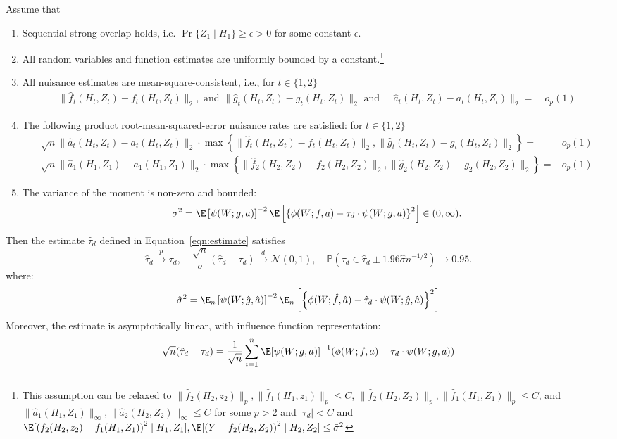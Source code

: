 \begin{theorem}\label{thm:inference}
Assume that
\begin{enumerate}
 \item Sequential strong overlap holds, i.e. $\Pr\{Z_1\mid H_1\}\geq \epsilon > 0$ for some constant $\epsilon$.
    \item All random variables and function estimates are uniformly bounded by a constant.\footnote{This assumption can be relaxed to $\|\hat{f}_2(H_2, z_2)\|_p, \|\hat{f}_1(H_1, z_1)\|_p\leq C$, $\|\hat{f}_2(H_2, Z_2)\|_p, \|\hat{f}_1(H_1, Z_1)\|_p \leq C$, and $\|\hat{a}_1(H_1, Z_1)\|_{\infty}, \|\hat{a}_2(H_2, Z_2)\|_{\infty}\leq C$  for some $p>2$ and $|\tau_d|<C$ and $\E[\left(f_2(H_2, z_2) - f_1(H_1, Z_1)\right)^2\mid H_1, Z_1],\E[\left(Y - f_2(H_2, Z_2)\right)^2\mid H_2, Z_2]\leq \bar{\sigma}^2$}
    \item All nuisance estimates are mean-square-consistent, i.e., for $t\in \{1, 2\}$
    \begin{align*}
        \|\hat{f}_t(H_t, Z_t) - f_t(H_t, Z_t)\|_2, \text{ and } \|\hat{g}_t(H_t, Z_t) - g_t(H_t, Z_t)\|_2 \text{ and } \|\hat{a}_t(H_t, Z_t) - a_t(H_t, Z_t)\|_2=~& o_p(1)
    \end{align*}
    \item The following product root-mean-squared-error nuisance rates are satisfied: for $t\in \{1, 2\}$
    \begin{align*}
    \sqrt{n}\|\hat{a}_t(H_t, Z_t) - a_t(H_t, Z_t)\|_2\cdot \max\left\{\|\hat{f}_t(H_t, Z_t) - f_t(H_t, Z_t)\|_2, \|\hat{g}_t(H_t, Z_t) - g_t(H_t, Z_t)\|_2\right\} =& o_p(1)\\
    \sqrt{n} \|\hat{a}_1(H_1, Z_1) - a_1(H_1, Z_1)\|_2\cdot \max\left\{\|\hat{f}_2(H_2, Z_2) - f_2(H_2, Z_2)\|_2,\|\hat{g}_2(H_2, Z_2) - g_2(H_2, Z_2)\|_2\right\} =& o_p(1)
    \end{align*}
    \item The variance of the moment is non-zero and bounded: 
    $$
    \sigma^2=\E\left[\psi(W; g, a)\right]^{-2} \E\left[\left\{\phi(W;f, a) - \tau_d\cdot   \psi(W; g, a)\right\}^2\right] \in (0, \infty).
    $$
\end{enumerate}
Then the estimate $\hat{\tau}_d$ defined in Equation~\eqref{eqn:estimate} satisfies
$$
\hat{\tau}_d\overset{p}{\rightarrow}\tau_d,\quad \frac{\sqrt{n}}{\sigma}(\hat{\tau}_d-\tau_d)\overset{d}{\rightarrow}\mathcal{N}(0,1),\quad \mathbb{P}(\tau_d\in \hat{\tau}_d \pm 1.96 \hat{\sigma}n^{-1/2})\rightarrow 0.95. 
$$
where:
\begin{align}\label{eqn:approx-variance}
    \hat{\sigma}^2 = \E_n\left[\psi(W; \hat{g}, \hat{a})\right]^{-2} \E_n\left[\left\{\phi(W; \hat{f}, \hat{a}) - \hat{\tau}_d\cdot   \psi(W; \hat{g}, \hat{a})\right\}^2\right]
\end{align}
Moreover, the estimate is asymptotically linear, with influence function representation:
\begin{align}
    \sqrt{n} (\hat{\tau}_d - \tau_d) = \frac{1}{\sqrt{n}} \sum_{i=1}^n \E[\psi(W;g,a)]^{-1}(\phi(W; f, a) - \tau_d\cdot \psi(W; g,a))
\end{align}
\end{theorem}
